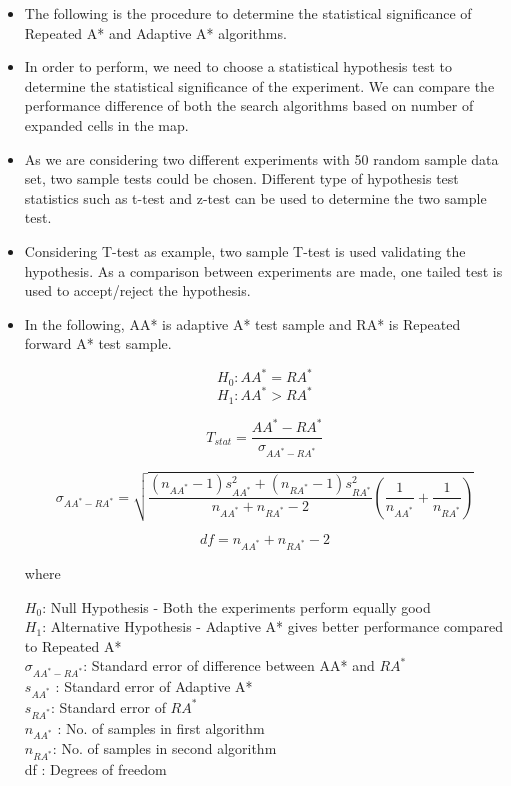 \documentclass[a4 paper]{article}
\begin{document}
\begin{itemize}
    \item The following is the procedure to determine the statistical significance of Repeated A* and Adaptive A* algorithms.
    \item In order to perform, we need to choose a statistical hypothesis test to determine the statistical significance of the experiment. We can compare the performance difference of both the search algorithms based on number of expanded cells in the map.
    \item As we are considering two different experiments with 50 random sample data set, two sample tests could be chosen. Different type of hypothesis test statistics such as t-test and z-test can be used to determine the two sample test.
    \item Considering T-test as example, two sample T-test is used validating the hypothesis. As a comparison between experiments are made, one tailed test is used to accept/reject the hypothesis.
    \item In the following, AA* is adaptive A* test sample and RA* is Repeated forward A* test sample.
    
    \begin{equation}
     H_0 : AA^* = RA^* 
    \end{equation}
    \begin{equation}
     H_1 : AA^* > RA^* 
    \end{equation}
    
    \begin{equation}
    T_{stat} = \frac{AA^* - RA^*}{\sigma_{AA^* - RA^*}}
    \end{equation}
    
    \begin{equation}
    \sigma_{AA^* - RA^*} = 
    \sqrt{\frac{({n_{AA^*}}-1)s_{AA^*}^2 + ({n_{RA^*}}-1)s_{RA^*}^2 }
    {{n_{AA^*}} + {n_{RA^*}} - 2} 
    ( \frac{1}{n_{AA^*}} + \frac{1}{n_{RA^*}} )}
    \end{equation}
    
    \begin{equation}
    df = n_{AA^*} + n_{RA^*} - 2
    \end{equation}
    
    where

    $H_0$:     Null Hypothesis - Both the experiments perform equally good  \\
    $H_1$:     Alternative Hypothesis - Adaptive A* gives better performance compared to Repeated A* \\
    $\sigma_{AA^* - RA^*}$:   Standard error of difference between AA* and $RA^*$ \\
    $s_{AA^*}$ : Standard error of Adaptive A* \\
    $s_{RA^*}$: Standard error of $RA^*$ \\
    $n_{AA^*}$ : No. of samples in first algorithm \\
    $n_{RA^*}$: No. of samples in second algorithm \\
    df        : Degrees of freedom 
   

\end{itemize}
\end{document}
